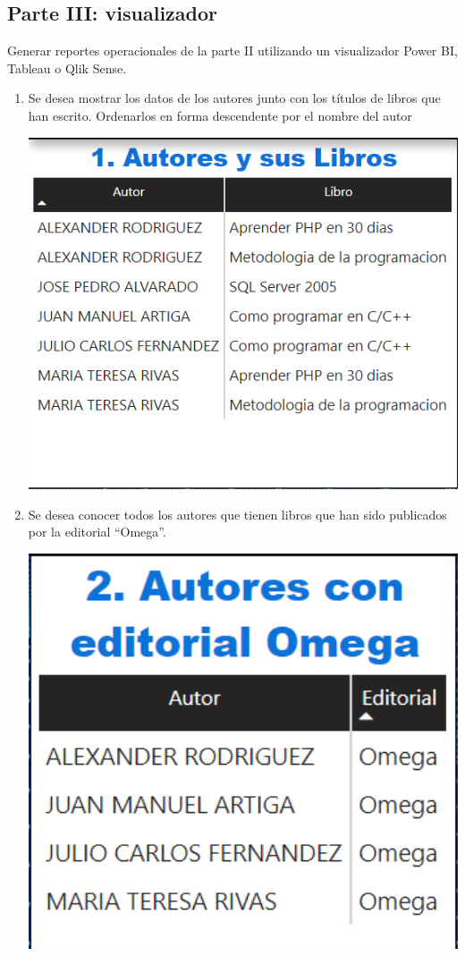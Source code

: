 \documentclass{article}
\begin{document}
    \subsection{Parte III: visualizador}
    Generar reportes operacionales de la parte II utilizando un visualizador Power BI, Tableau o Qlik Sense.
    \begin{enumerate}[\tab 1.]
        \item Se desea mostrar los datos de los autores junto con los títulos de libros que han escrito. Ordenarlos en forma descendente por el nombre del autor
        \begin{center}
            \includegraphics[width=13cm]{./images/13.png}
        \end{center}
        \newpage
        \item Se desea conocer todos los autores que tienen libros que han sido publicados por la editorial “Omega”.
        \begin{center}
            \includegraphics[width=13cm]{./images/14.png}

\end{center}
\end{enumerate}
\end{document}
